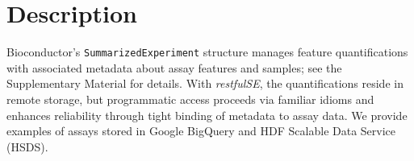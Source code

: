 \documentclass[applications]{gen-bioinformatics}
\newcommand{\Biocpackage}[1]{{\textit{#1}}}
\begin{document}
\section*{Description}



Bioconductor's \texttt{SummarizedExperiment} structure
manages feature quantifications
with associated metadata about assay features
and samples; see the Supplementary Material for details.
With \Biocpackage{restfulSE}, the quantifications reside in
remote storage, but programmatic access proceeds via familiar
idioms and enhances reliability through tight binding
of metadata to assay data.  We provide examples of assays
stored in Google BigQuery and HDF Scalable Data Service (HSDS).


%
\end{document}
